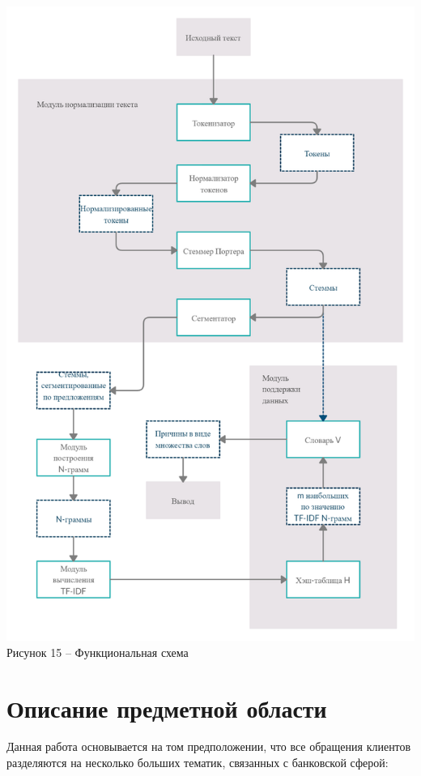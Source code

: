 \documentclass[a4paper,12pt,preview]{report} %
\begin{document}
	\begin{center}
		\includegraphics[scale=0.3]{scheme.jpg}
		\\ Рисунок 15 -- Функциональная схема
	\end{center}
	
	\section{Описание предметной области}
	
	Данная работа основывается на том предположении, что все обращения клиентов разделяются на несколько больших тематик, связанных с банковской сферой:
	
\end{document}
